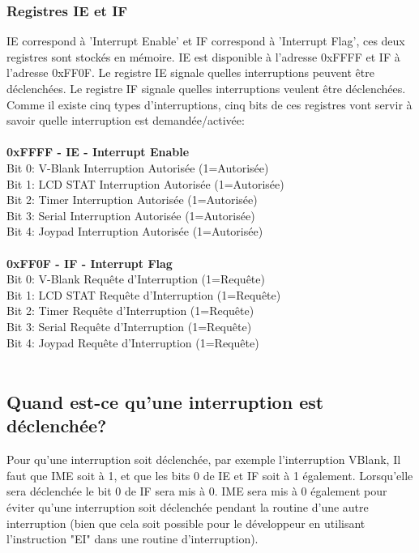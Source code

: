 \documentclass[french]{report}
\begin{document}
\subsubsection{Registres IE et IF} 
IE correspond à 'Interrupt Enable' et IF correspond à 'Interrupt Flag', ces deux registres sont stockés en mémoire. IE est disponible à l'adresse 0xFFFF et IF à l'adresse 0xFF0F. Le registre IE signale quelles interruptions peuvent être déclenchées. Le registre IF signale quelles interruptions veulent être déclenchées.
Comme il existe cinq types d'interruptions, cinq bits de ces registres vont servir à savoir quelle interruption est demandée/activée:\\\\
\textbf{0xFFFF - IE - Interrupt Enable} \\
Bit 0: V-Blank  Interruption Autorisée  (1=Autorisée)\\
Bit 1: LCD STAT Interruption Autorisée  (1=Autorisée)\\
Bit 2: Timer    Interruption Autorisée  (1=Autorisée)\\
Bit 3: Serial   Interruption Autorisée  (1=Autorisée)\\
Bit 4: Joypad   Interruption Autorisée  (1=Autorisée)\\\\
\textbf{0xFF0F - IF - Interrupt Flag} \\
Bit 0: V-Blank  Requête d'Interruption  (1=Requête)\\
Bit 1: LCD STAT Requête d'Interruption  (1=Requête)\\
Bit 2: Timer    Requête d'Interruption  (1=Requête)\\
Bit 3: Serial   Requête d'Interruption  (1=Requête)\\
Bit 4: Joypad   Requête d'Interruption  (1=Requête)\\\\

\subsection{Quand est-ce qu'une interruption est déclenchée?}
Pour qu'une interruption soit déclenchée, par exemple l'interruption VBlank, Il faut que IME soit à 1, et que les bits 0 de IE et IF soit à 1 également.
Lorsqu'elle sera déclenchée le bit 0 de IF sera mis à 0. IME sera mis à 0 également pour éviter qu'une interruption soit déclenchée pendant la routine d'une autre interruption (bien que cela soit possible pour le développeur en utilisant l'instruction "EI" dans une routine d'interruption).
\end{document}
